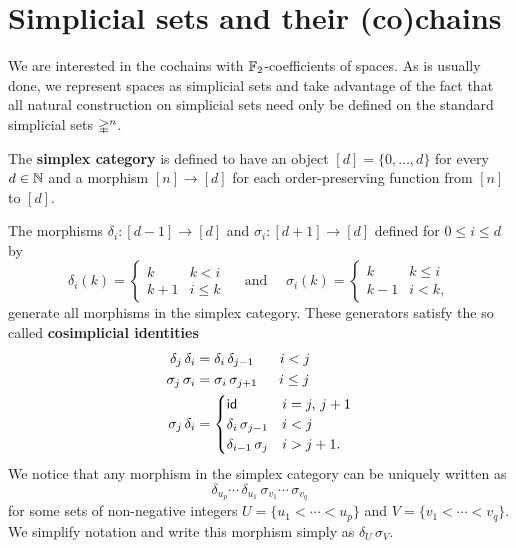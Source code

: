 
\section{Simplicial sets and their (co)chains}

We are interested in the cochains with ${\mathbb{F}_2}$-coefficients of spaces.
As is usually done, we represent spaces as simplicial sets and take advantage of the fact that all natural construction on simplicial sets need only be defined on the standard simplicial sets $\mathbb{\Delta}^n$.

The \textbf{simplex category} is defined to have an object $[d] = \{0, \dots, d\}$ for every $d \in \mathbb{N}$ and a morphism $[n] \to [d]$ for each order-preserving function from $[n]$ to $[d]$.

The morphisms $\delta_i \colon [d-1] \to [d]$ and $\sigma_i \colon [d+1] \to [d]$ defined for $0 \leq i \leq d$ by
\[
\delta_i(k) =
\begin{cases} k & k < i \\ k+1 & i \leq k \end{cases}
\quad \text{ and } \quad
\sigma_i(k) =
\begin{cases} k & k \leq i \\ k-1 & i < k, \end{cases}
\]
generate all morphisms in the simplex category.
These generators satisfy the so called \textbf{cosimplicial identities}
\[
\begin{split}
\delta_j \, \delta_i &= \delta_i \, \delta_{j-1} \hspace*{18.5pt} i < j \\
\sigma_j \, \sigma_i &= \sigma_i \, \sigma_{j+1} \hspace*{15.5pt} i \leq j \\
\sigma_j \, \delta_i &=
\begin{cases}
\mathsf{id} & i = j,\, j+1 \\
\delta_i \, \sigma_{j-1} & i < j \\
\delta_{i-1} \, \sigma_{j} & i > j + 1.
\end{cases}
\end{split}
\]
We notice that any morphism in the simplex category can be uniquely written as
\[
\delta_{u_{p}} \cdots\, \delta_{u_1}\, \sigma_{v_1} \cdots\, \sigma_{v_q}
\]
for some sets of non-negative integers $U = \{u_1 < \cdots < u_{p}\}$ and $V = \{v_1 < \cdots < v_{q}\}$.
We simplify notation and write this morphism simply as $\delta_U\, \sigma_V$.

